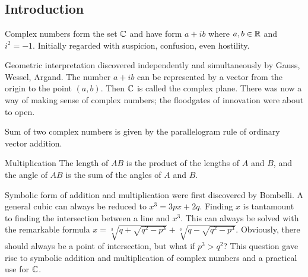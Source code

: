 \section{}
\begin{outline}
\end{outline}

\begin{card}
    \subsection{Introduction}

    \begin{compactdesc}
    \item[Complex numbers] form the set $\mathbb{C}$ and
        have form $a + ib$ where $a,b\in\mathbb{R}$ and $i^2=-1$.
        Initially regarded with suspicion, confusion, even hostility.
    \item[Geometric interpretation] discovered independently and simultaneously
        by Gauss, Wessel, Argand. The number $a + ib$ can be represented by
        a vector from the origin to the point $(a,b)$. Then $\mathbb{C}$ is called the
        complex plane. There was now a way of making sense of complex numbers;
        the floodgates of innovation were about to open.
    \item[Sum] of two complex numbers is given by the parallelogram rule of
        ordinary vector addition.
    \item[Multiplication] The length of $AB$ is the product of the lengths of
        $A$ and $B$, and the angle of $AB$ is the sum of the angles of $A$ and
        $B$.
    \item[Symbolic form] of addition and multiplication were first discovered
        by Bombelli. A general cubic can always be reduced to $x^3 = 3px + 2q$.
        Finding $x$ is tantamount to finding the intersection between a line
        and $x^3$. This can always be solved with the remarkable formula
        $x = \sqrt[3]{q + \sqrt{q^2 - p^3}}
           + \sqrt[3]{q - \sqrt{q^2 - p^3}}$.
        Obviously, there should always be a point of intersection, but
        what if $p^3 > q^2$?
        This question gave rise to symbolic addition and multiplication of complex numbers
        and a practical use for $\mathbb{C}$.
    \end{compactdesc}
\end{card}
